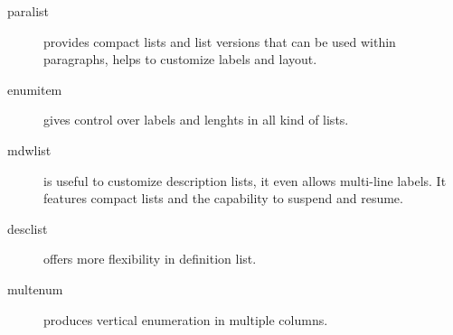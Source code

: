 \documentclass{article}
\begin{document}
\begin{description}
  \item[paralist] provides compact lists and list
    versions that can be used within paragraphs,
    helps to customize labels and layout.
  \item[enumitem] gives control over labels
    and lenghts in all kind of lists.
  \item[mdwlist] is useful to customize description
    lists, it even allows multi-line labels.
    It features compact lists and the capability
    to suspend and resume.
  \item[desclist] offers more flexibility in
    definition list.
  \item[multenum] produces vertical enumeration in
    multiple columns.
\end{description}
\end{document}
